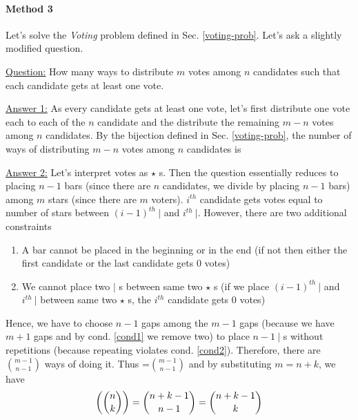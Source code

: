 \paragraph{Method 3} Let's solve the \emph{Voting} problem defined in Sec. \ref{voting-prob}. Let's ask a slightly modified question. 
\begin{description}
\item \underline{Question:} How many ways to distribute $m$ votes among $n$ candidates such that each candidate gets at least one vote.
\item \underline{Answer 1:} As every candidate gets at least one vote, let's first distribute one vote each to each of the $n$ candidate and the distribute the remaining $m-n$ votes among $n$ candidates. By the bijection defined in Sec. \ref{voting-prob}, the number of ways of distributing $m-n$ votes among $n$ candidates is   
\item \underline{Answer 2:} Let's interpret votes as $\star$ s. Then the question essentially reduces to placing $n-1$ bars (since there are $n$ candidates, we divide by placing $n-1$ bars) among $m$ stars (since there are $m$ voters). $i^{th}$ candidate gets votes equal to number of stars between $(i-1)^{th}~|$ and $i^{th}~|$. However, there are two additional constraints \begin{enumerate}
    \item\label{cond1} A bar cannot be placed in the beginning or in the end (if not then either the first candidate or the last candidate gets $0$ votes)
    \item\label{cond2} We cannot place two $|$ s between same two $\star$ s (if we place $(i-1)^{th}~|$ and $i^{th}~|$ between same two $\star$ s, the $i^{th}$ candidate gets $0$ votes)
\end{enumerate}
Hence, we have to choose $n-1$ gaps among the $m-1$ gaps (because we have $m+1$ gaps and by cond. \ref{cond1} we remove two) to place $n-1~|$ s without repetitions (because repeating violates cond. \ref{cond2}). Therefore, there are $\binom{m-1}{n-1}$ ways of doing it. Thus =$\binom{m-1}{n-1}$ and by substituting $m=n+k$, we have $$\textrm{$\left(\binom{n}{k}\right)$}=\binom{n+k-1}{n-1}=\binom{n+k-1}{k}$$
\end{description}

